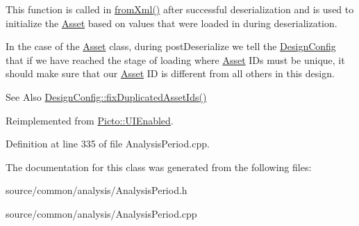 This function is called in \hyperlink{class_picto_1_1_asset_a8bed4da09ecb1c07ce0dab313a9aba67}{from\-Xml()} after successful deserialization and is used to initialize the \hyperlink{class_picto_1_1_asset}{Asset} based on values that were loaded in during deserialization. 

In the case of the \hyperlink{class_picto_1_1_asset}{Asset} class, during post\-Deserialize we tell the \hyperlink{class_picto_1_1_design_config}{Design\-Config} that if we have reached the stage of loading where \hyperlink{class_picto_1_1_asset}{Asset} I\-Ds must be unique, it should make sure that our \hyperlink{class_picto_1_1_asset}{Asset} I\-D is different from all others in this design. \begin{DoxySeeAlso}{See Also}
\hyperlink{class_picto_1_1_design_config_ab57e0738b97e4358ab09530cd6815fc0}{Design\-Config\-::fix\-Duplicated\-Asset\-Ids()} 
\end{DoxySeeAlso}


Reimplemented from \hyperlink{class_picto_1_1_u_i_enabled_ae1585113a496ff2c8de3293aa884b57b}{Picto\-::\-U\-I\-Enabled}.



Definition at line 335 of file Analysis\-Period.\-cpp.



The documentation for this class was generated from the following files\-:\begin{DoxyCompactItemize}
\item 
source/common/analysis/Analysis\-Period.\-h\item 
source/common/analysis/Analysis\-Period.\-cpp\end{DoxyCompactItemize}
